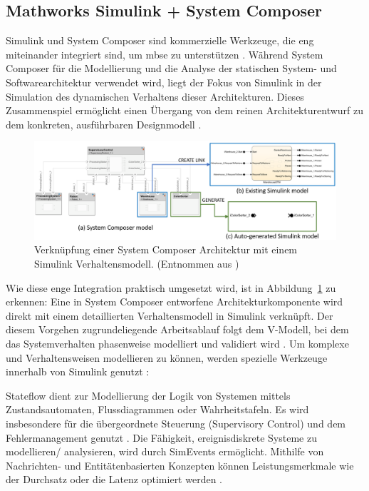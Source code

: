 \subsection{Mathworks Simulink + System Composer}
Simulink und System Composer sind kommerzielle Werkzeuge, die eng miteinander integriert sind, um \gls{mbse} zu unterstützen \cite{watkins2020system}.
Während System Composer für die Modellierung und die Analyse der statischen System- und Softwarearchitektur verwendet wird, liegt der Fokus von Simulink in der Simulation des dynamischen Verhaltens dieser Architekturen. Dieses Zusammenspiel ermöglicht einen Übergang von dem reinen Architekturentwurf zu dem konkreten, ausführbaren Designmodell \cite{chatterjee2020applications}.

\begin{figure}[h!]
  \centering
  \includegraphics[width=\textwidth]{figures/03StandDerTechnik/Simulink_System_Composer.png}
  \caption{Verknüpfung einer System Composer Architektur mit einem Simulink Verhaltensmodell. (Entnommen aus \cite{chatterjee2020applications})}
  \label{fig:simulink_system_composer}
\end{figure}

Wie diese enge Integration praktisch umgesetzt wird, ist in Abbildung~\ref{fig:simulink_system_composer} zu erkennen: Eine in System Composer entworfene Architekturkomponente wird direkt mit einem detaillierten Verhaltensmodell in Simulink verknüpft. Der diesem Vorgehen zugrundeliegende Arbeitsablauf folgt dem V-Modell, bei dem das Systemverhalten phasenweise modelliert und validiert wird \cite{themathworksinc.2025system}. Um komplexe und Verhaltensweisen modellieren zu können, werden spezielle Werkzeuge innerhalb von Simulink genutzt \cite{chatterjee2020applications}:

Stateflow dient zur Modellierung der Logik von Systemen mittels Zustandsautomaten, Flussdiagrammen oder Wahrheitstafeln. Es wird insbesondere für die übergeordnete Steuerung (Supervisory Control) und dem Fehlermanagement genutzt \cite{chatterjee2020applications}. Die Fähigkeit, ereignisdiskrete Systeme zu modellieren/ analysieren, wird durch SimEvents ermöglicht. Mithilfe von Nachrichten- und Entitätenbasierten Konzepten können Leistungsmerkmale wie der Durchsatz oder die Latenz optimiert werden \cite{chatterjee2020applications}.

